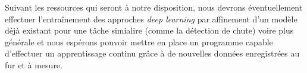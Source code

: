 Suivant les ressources qui seront à notre disposition, nous devrons éventuellement effectuer l'entraînement des approches \textit{deep learning} par affinement d'un modèle déjà existant pour une tâche simialire (comme la détection de chute) voire plus générale et nous espérons pouvoir mettre en place un programme capable d'effectuer un apprentissage continu grâce à de nouvelles données enregistrées au fur et à mesure.